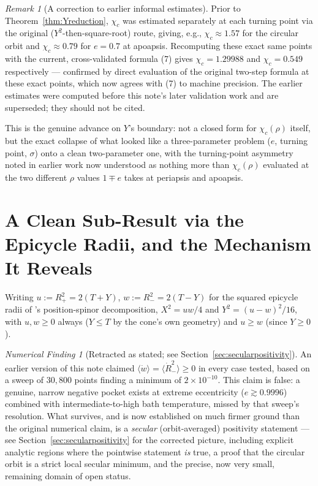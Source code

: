\documentclass[12pt]{amsart}
\theoremstyle{plain}
\theoremstyle{remark}
\newtheorem*{remark}{Remark}
\newtheorem*{finding}{Numerical Finding}
\begin{document}
\begin{remark}[A correction to earlier informal estimates]
Prior to Theorem~\ref{thm:Yreduction}, $\chi_c$ was estimated separately at each turning point via the original ($Y^2$-then-square-root) route, giving, e.g., $\chi_c\approx1.57$ for the circular orbit and $\chi_c\approx0.79$ for $e=0.7$ at apoapsis. Recomputing these exact same points with the current, cross-validated formula (7) gives $\chi_c=1.29988$ and $\chi_c=0.549$ respectively --- confirmed by direct evaluation of the original two-step formula at these exact points, which now agrees with (7) to machine precision. The earlier estimates were computed before this note's later validation work and are superseded; they should not be cited.
\end{remark}

This is the genuine advance on $Y$'s boundary: not a closed form for $\chi_c(\rho)$ itself, but the exact collapse of what looked like a three-parameter problem ($e$, turning point, $\sigma$) onto a clean two-parameter one, with the turning-point asymmetry noted in earlier work now understood as nothing more than $\chi_c(\rho)$ evaluated at the two different $\rho$ values $1\mp e$ takes at periapsis and apoapsis.

\section{A Clean Sub-Result via the Epicycle Radii, and the Mechanism It Reveals}\label{sec:Rminus}

Writing $u:=R_+^2=2(T+Y)$, $w:=R_-^2=2(T-Y)$ for the squared epicycle radii of \cite{Ebert2026LeviCivita}'s position-spinor decomposition, $X^2=uw/4$ and $Y^2=(u-w)^2/16$, with $u,w\geq0$ always ($Y\leq T$ by the cone's own geometry) and $u\geq w$ (since $Y\geq0$).

\begin{finding}[Retracted as stated; see Section~\ref{sec:secularpositivity}]\label{find:Rminus}
An earlier version of this note claimed $\langle\dot w\rangle=\langle\dot R_-^2\rangle\geq0$ in every case tested, based on a sweep of $30{,}800$ points finding a minimum of $2\times10^{-10}$. This claim is false: a genuine, narrow negative pocket exists at extreme eccentricity ($e\gtrsim0.9996$) combined with intermediate-to-high bath temperature, missed by that sweep's resolution. What survives, and is now established on much firmer ground than the original numerical claim, is a \emph{secular} (orbit-averaged) positivity statement --- see Section~\ref{sec:secularpositivity} for the corrected picture, including explicit analytic regions where the pointwise statement \emph{is} true, a proof that the circular orbit is a strict local secular minimum, and the precise, now very small, remaining domain of open status.
\end{finding}
\end{document}
